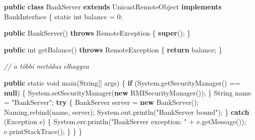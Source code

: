 \documentclass[
]{article}
\newenvironment{Shaded}{}{}
\newcommand{\BuiltInTok}[1]{\textcolor[rgb]{0.00,0.50,0.00}{#1}}
\newcommand{\CommentTok}[1]{\textcolor[rgb]{0.38,0.63,0.69}{\textit{#1}}}
\newcommand{\ControlFlowTok}[1]{\textcolor[rgb]{0.00,0.44,0.13}{\textbf{#1}}}
\newcommand{\DataTypeTok}[1]{\textcolor[rgb]{0.56,0.13,0.00}{#1}}
\newcommand{\DecValTok}[1]{\textcolor[rgb]{0.25,0.63,0.44}{#1}}
\newcommand{\FunctionTok}[1]{\textcolor[rgb]{0.02,0.16,0.49}{#1}}
\newcommand{\KeywordTok}[1]{\textcolor[rgb]{0.00,0.44,0.13}{\textbf{#1}}}
\newcommand{\NormalTok}[1]{#1}
\newcommand{\OperatorTok}[1]{\textcolor[rgb]{0.40,0.40,0.40}{#1}}
\newcommand{\StringTok}[1]{\textcolor[rgb]{0.25,0.44,0.63}{#1}}
\begin{document}
\begin{Shaded}
\begin{Highlighting}[]
\KeywordTok{public} \KeywordTok{class}\NormalTok{ BankServer }\KeywordTok{extends} \BuiltInTok{UnicastRemoteObject} \KeywordTok{implements}\NormalTok{ BankInterface }\OperatorTok{\{}
    \DataTypeTok{static} \DataTypeTok{int}\NormalTok{ balance }\OperatorTok{=} \DecValTok{0}\OperatorTok{;}

    \KeywordTok{public} \FunctionTok{BankServer}\OperatorTok{()} \KeywordTok{throws} \BuiltInTok{RemoteException} \OperatorTok{\{}
        \KeywordTok{super}\OperatorTok{();}
    \OperatorTok{\}}

    \KeywordTok{public} \DataTypeTok{int} \FunctionTok{getBalance}\OperatorTok{()} \KeywordTok{throws} \BuiltInTok{RemoteException} \OperatorTok{\{}
        \ControlFlowTok{return}\NormalTok{ balance}\OperatorTok{;}
    \OperatorTok{\}}

    \CommentTok{// a többi metódus elhagyva}

    \KeywordTok{public} \DataTypeTok{static} \DataTypeTok{void} \FunctionTok{main}\OperatorTok{(}\BuiltInTok{String}\OperatorTok{[]}\NormalTok{ args}\OperatorTok{)} \OperatorTok{\{}
        \ControlFlowTok{if} \OperatorTok{(}\BuiltInTok{System}\OperatorTok{.}\FunctionTok{getSecurityManager}\OperatorTok{()} \OperatorTok{==} \KeywordTok{null}\OperatorTok{)} \OperatorTok{\{}
            \BuiltInTok{System}\OperatorTok{.}\FunctionTok{setSecurityManager}\OperatorTok{(}\KeywordTok{new} \BuiltInTok{RMISecurityManager}\OperatorTok{());}
        \OperatorTok{\}}
        \BuiltInTok{String}\NormalTok{ name }\OperatorTok{=} \StringTok{"BankServer"}\OperatorTok{;}
        \ControlFlowTok{try} \OperatorTok{\{}
\NormalTok{            BankServer server }\OperatorTok{=} \KeywordTok{new} \FunctionTok{BankServer}\OperatorTok{();}
            \BuiltInTok{Naming}\OperatorTok{.}\FunctionTok{rebind}\OperatorTok{(}\NormalTok{name}\OperatorTok{,}\NormalTok{ server}\OperatorTok{);}
            \BuiltInTok{System}\OperatorTok{.}\FunctionTok{out}\OperatorTok{.}\FunctionTok{println}\OperatorTok{(}\StringTok{"BankServer bound"}\OperatorTok{);}
        \OperatorTok{\}} \ControlFlowTok{catch} \OperatorTok{(}\BuiltInTok{Exception}\NormalTok{ e}\OperatorTok{)} \OperatorTok{\{}
            \BuiltInTok{System}\OperatorTok{.}\FunctionTok{err}\OperatorTok{.}\FunctionTok{println}\OperatorTok{(}\StringTok{"BankServer exception: "} \OperatorTok{+}\NormalTok{ e}\OperatorTok{.}\FunctionTok{getMessage}\OperatorTok{());}
\NormalTok{            e}\OperatorTok{.}\FunctionTok{printStackTrace}\OperatorTok{();}
        \OperatorTok{\}}
    \OperatorTok{\}}
\OperatorTok{\}}
\end{Highlighting}
\end{Shaded}
\end{document}
